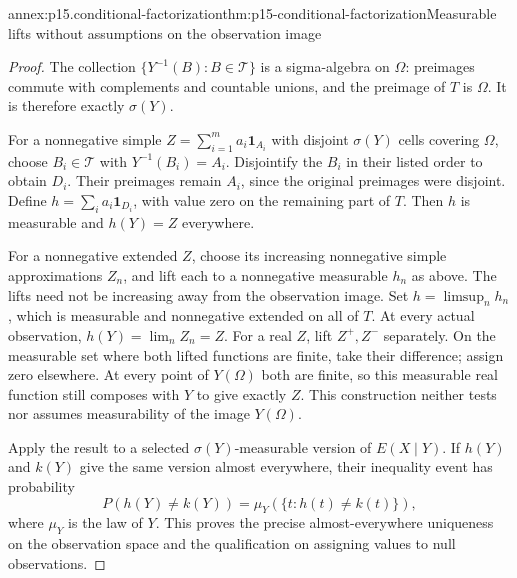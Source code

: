 \begin{annexitem}{annex:p15.conditional-factorization}{thm:p15-conditional-factorization}{Measurable lifts without assumptions on the observation image}
\begin{proof}
The collection \(\{Y^{-1}(B):B\in\mathcal T\}\) is a sigma-algebra
on \(\Omega\): preimages commute with complements and countable unions,
and the preimage of \(T\) is \(\Omega\).
It is therefore exactly \(\sigma(Y)\).

For a nonnegative simple \(Z=\sum_{i=1}^m a_i\mathbf1_{A_i}\)
with disjoint \(\sigma(Y)\) cells covering \(\Omega\), choose
\(B_i\in\mathcal T\) with \(Y^{-1}(B_i)=A_i\).
Disjointify the \(B_i\) in their listed order to obtain \(D_i\).
Their preimages remain \(A_i\), since the original preimages were
disjoint. Define \(h=\sum_i a_i\mathbf1_{D_i}\), with value zero
on the remaining part of \(T\). Then \(h\) is measurable and
\(h(Y)=Z\) everywhere.

For a nonnegative extended \(Z\), choose its increasing nonnegative
simple approximations \(Z_n\), and lift each to a nonnegative
measurable \(h_n\) as above. The lifts need not be increasing
away from the observation image. Set \(h=\limsup_nh_n\), which
is measurable and nonnegative extended on all of \(T\).
At every actual observation, \(h(Y)=\lim_nZ_n=Z\).
For a real \(Z\), lift \(Z^+,Z^-\) separately.
On the measurable set where both lifted functions are finite,
take their difference; assign zero elsewhere. At every point
of \(Y(\Omega)\) both are finite, so this measurable real function
still composes with \(Y\) to give exactly \(Z\).
This construction neither tests nor assumes measurability of
the image \(Y(\Omega)\).

Apply the result to a selected \(\sigma(Y)\)-measurable version
of \(E(X\mid Y)\). If \(h(Y)\) and \(k(Y)\) give the same version
almost everywhere, their inequality event has probability
\[
             P(h(Y)\ne k(Y))=\mu_Y(\{t:h(t)\ne k(t)\}),
\]
where \(\mu_Y\) is the law of \(Y\).
This proves the precise almost-everywhere uniqueness on the observation
space and the qualification on assigning values to null observations.
\end{proof}
\end{annexitem}

